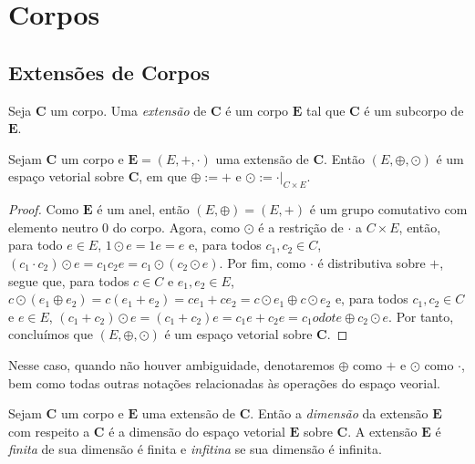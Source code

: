 \section{Corpos}

\subsection{Extensões de Corpos}

\begin{defi}
	Seja $\bm C$ um corpo. Uma \emph{extensão} de $\bm C$ é um corpo $\bm E$ tal que $\bm C$ é um subcorpo de $\bm E$.
\end{defi}

\begin{prop}
	Sejam $\bm C$ um corpo e $\bm E = (E,+,\cdot)$ uma extensão de $\bm C$. Então $(E,\oplus,\odot)$ é um espaço vetorial sobre $\bm C$, em que $\oplus := +$ e $\odot := \cdot|_{C \times E}$.
\end{prop}
\begin{proof}
	Como $\bm E$ é um anel, então $(E,\oplus)=(E,+)$ é um grupo comutativo com elemento neutro $0$ do corpo. Agora, como $\odot$ é a restrição de $\cdot$ a $C \times E$, então, para todo $e \in E$, $1 \odot e = 1e = e$ e, para todos $c_1,c_2 \in C$, $(c_1 \cdot c_2) \odot e = c_1c_2e = c_1 \odot (c_2 \odot e)$. Por fim, como $\cdot$ é distributiva sobre $+$, segue que, para todos $c \in C$ e $e_1,e_2 \in E$, $c \odot (e_1 \oplus e_2) = c(e_1+e_2) = ce_1+ce_2 = c \odot e_1 \oplus c \odot e_2$ e, para todos $c_1,c_2 \in C$ e $e \in E$, $(c_1+c_2) \odot e = (c_1+c_2)e = c_1e+c_2e = c_1 odot e \oplus c_2 \odot e$. Por tanto, concluímos que $(E,\oplus,\odot)$ é um espaço vetorial sobre $\bm C$.
\end{proof}

\begin{nota}
	Nesse caso, quando não houver ambiguidade, denotaremos $\oplus$ como $+$ e $\odot$ como $\cdot$, bem como todas outras notações relacionadas às operações do espaço veorial.
\end{nota}

\begin{defi}
	Sejam $\bm C$ um corpo e $\bm E$ uma extensão de $\bm C$. Então a \emph{dimensão} da extensão $\bm E$ com respeito a $\bm C$ é a dimensão do espaço vetorial $\bm E$ sobre $\bm C$. A extensão $\bm E$ é \emph{finita} de sua dimensão é finita e \emph{infitina} se sua dimensão é infinita.
\end{defi}

